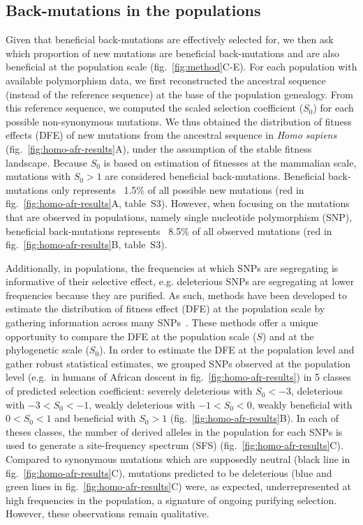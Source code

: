 \documentclass{article}
\newcommand{\Sphy}{S_{0}}
\newcommand{\divStrongDel}{\Sphy < -3}
\newcommand{\divDel}{-3 < \Sphy < -1}
\newcommand{\divWeakDel}{-1 < \Sphy < 0}
\newcommand{\divWeakAdv}{0 < \Sphy < 1}
\newcommand{\divAdv}{ \Sphy > 1}
\newcommand{\Spop}{S}
\begin{document}
    \subsection*{Back-mutations in the populations}
    Given that beneficial back-mutations are effectively selected for, we then ask which proportion of new mutations are beneficial back-mutations and are also beneficial at the population scale (fig.~\ref{fig:method}C-E).
    For each population with available polymorphism data, we first reconstructed the ancestral sequence (instead of the reference sequence) at the base of the population genealogy.
    From this reference sequence, we computed the scaled selection coefficient ($\Sphy$) for each possible non-synonymous mutations.
    We thus obtained the distribution of fitness effects (DFE) of new mutations from the ancestral sequence in \textit{Homo sapiens} (fig.~\ref{fig:homo-afr-results}A), under the assumption of the stable fitness landscape.
    Because $\Sphy$ is based on estimation of fitnesses at the mammalian scale, mutations with $\Sphy>1$ are considered beneficial back-mutations.
    Beneficial back-mutations only represents ~1.5\% of all possible new mutations (red in fig.~\ref{fig:homo-afr-results}A, table~S3).
    However, when focusing on the mutations that are observed in populations, namely single nucleotide polymorphism (SNP), beneficial back-mutations represents ~8.5\% of all observed mutations (red in fig.~\ref{fig:homo-afr-results}B, table~S3).

    Additionally, in populations, the frequencies at which SNPs are segregating is informative of their selective effect, e.g. deleterious SNPs are segregating at lower frequencies because they are purified.
    As such, methods have been developed to estimate the distribution of fitness effect (DFE) at the population scale by gathering information across many SNPs~\cite{eyre-walker_distribution_2006a, eyre-walker_estimating_2009a, galtier_adaptive_2016, tataru_inference_2017}.
    These methods offer a unique opportunity to compare the DFE at the population scale ($\Spop$) and at the phylogenetic scale ($\Sphy$).
    In order to estimate the DFE at the population level and gather robust statistical estimates, we grouped SNPs observed at the population level (e.g.~in humans of African descent in fig.~\ref{fig:homo-afr-results}) in 5 classes of predicted selection coefficient: severely deleterious with $\divStrongDel$, deleterious with $\divDel$, weakly deleterious with $\divWeakDel$, weakly beneficial with $\divWeakAdv$ and beneficial with $\divAdv$ (fig.~\ref{fig:homo-afr-results}B).
    In each of theses classes, the number of derived alleles in the population for each SNPs is used to generate a site-frequency spectrum (SFS) (fig.~\ref{fig:homo-afr-results}C).
    Compared to synonymous mutations which are supposedly neutral (black line in fig.~\ref{fig:homo-afr-results}C), mutations predicted to be deleterious (blue and green lines in fig.~\ref{fig:homo-afr-results}C) were, as expected, underrepresented at high frequencies in the population, a signature of ongoing purifying selection.
    However, these observations remain qualitative.
\end{document}
